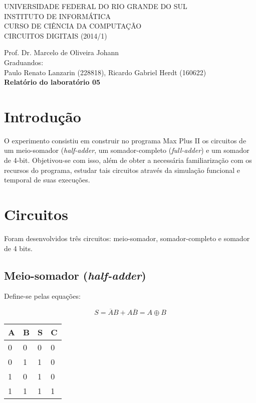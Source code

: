 \documentclass[a4paper]{article}
\begin{document}
\begin{center}


\large{ 
\uppercase{ Universidade Federal do Rio Grande do Sul\\

Instituto de Informática \\

Curso de Ciência da Computação \\

Circuitos Digitais (2014/1)\\
}

Prof. Dr. Marcelo de Oliveira Johann \\

Graduandos: \\ Paulo Renato Lanzarin (228818), Ricardo Gabriel Herdt (160622) \\[1cm]

\bfseries Relatório do laboratório 05\\[1.0cm]
}

\end{center}
\section{Introdução}

	O experimento consistiu em construir no programa Max Plus II os
circuitos de um meio-somador (\emph{half-adder}, um somador-completo
(\emph{full-adder}) e um somador de 4-bit.  Objetivou-se com isso, além de
obter a necessária familiarização com os recursos do programa, estudar tais
circuitos através da simulação funcional e temporal de suas execuções.


\section{Circuitos}

Foram desenvolvidos três circuitos: meio-somador, somador-completo e somador de
4 bits.

\subsection{Meio-somador (\emph{half-adder})}

Define-se pelas equações:

\begin{equation*}
	S = \overline{A}B + A\overline{B} = A \oplus B
\end{equation*}

\begin{center}
\begin{tabular}{| l | l | l | l |}
	\hline
	A	&B	&S	&C	\\
	\hline
	0	&0	&0	&0	\\
	0	&1	&1	&0	\\
	1	&0	&1	&0	\\
	1	&1	&1	&1	\\
	\hline
\end{tabular}
\end{center}






\end{document}
